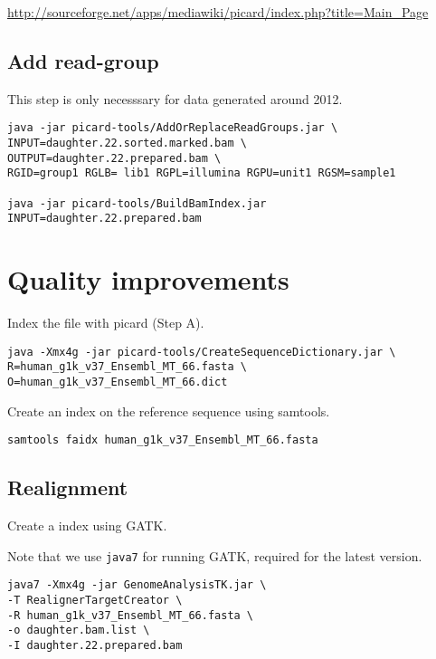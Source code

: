 \documentclass{article}
\begin{document}
\url{http://sourceforge.net/apps/mediawiki/picard/index.php?title=Main_Page}

\subsection{Add read-group}

This step is only necesssary for data generated around 2012.

\begin{verbatim}
java -jar picard-tools/AddOrReplaceReadGroups.jar \
INPUT=daughter.22.sorted.marked.bam \
OUTPUT=daughter.22.prepared.bam \
RGID=group1 RGLB= lib1 RGPL=illumina RGPU=unit1 RGSM=sample1

java -jar picard-tools/BuildBamIndex.jar INPUT=daughter.22.prepared.bam
\end{verbatim}

\section{Quality improvements}
Index the file with picard (Step A). 

\begin{verbatim}
java -Xmx4g -jar picard-tools/CreateSequenceDictionary.jar \
R=human_g1k_v37_Ensembl_MT_66.fasta \
O=human_g1k_v37_Ensembl_MT_66.dict
\end{verbatim}           

Create an index on the reference sequence using samtools.


\begin{verbatim}
samtools faidx human_g1k_v37_Ensembl_MT_66.fasta
\end{verbatim}

\subsection{Realignment}
Create a index using GATK. 

Note that we use \verb+java7+ for running GATK, required for the latest version.

\begin{verbatim}
java7 -Xmx4g -jar GenomeAnalysisTK.jar \
-T RealignerTargetCreator \
-R human_g1k_v37_Ensembl_MT_66.fasta \
-o daughter.bam.list \
-I daughter.22.prepared.bam 
\end{verbatim}
\end{document}
